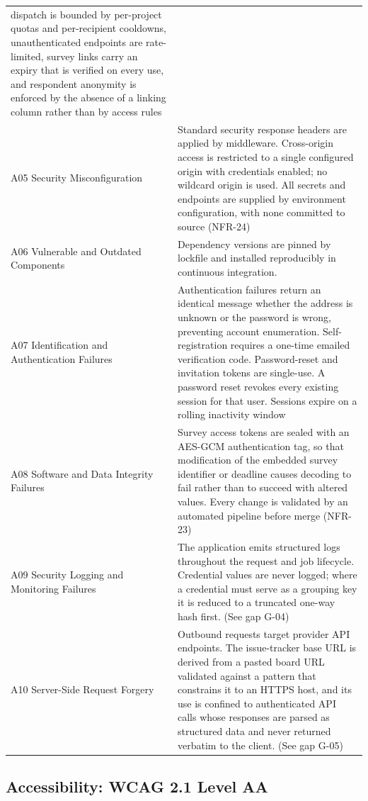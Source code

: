 \begin{longtable}{
  >{\raggedright\arraybackslash}p{}
  >{\raggedright\arraybackslash}p{}
}
dispatch is bounded by per-project quotas and per-recipient cooldowns,
unauthenticated endpoints are rate-limited, survey links carry an expiry that is
verified on every use, and respondent anonymity is enforced by the absence of a
linking column rather than by access rules \\
\addlinespace
A05 Security Misconfiguration & Standard security response headers are applied by
middleware. Cross-origin access is restricted to a single configured origin with
credentials enabled; no wildcard origin is used. All secrets and endpoints are
supplied by environment configuration, with none committed to source (NFR-24) \\
\addlinespace
A06 Vulnerable and Outdated Components & Dependency versions are pinned by lockfile
and installed reproducibly in continuous integration. \\
\addlinespace
A07 Identification and Authentication Failures & Authentication failures return an
identical message whether the address is unknown or the password is wrong, preventing
account enumeration. Self-registration requires a one-time emailed verification
code. Password-reset and invitation tokens are single-use. A password reset revokes
every existing session for that user. Sessions expire on a rolling inactivity window
\\
\addlinespace
A08 Software and Data Integrity Failures & Survey access tokens are sealed with an
AES-GCM authentication tag, so that modification of the embedded survey identifier or
deadline causes decoding to fail rather than to succeed with altered values. Every
change is validated by an automated pipeline before merge (NFR-23) \\
\addlinespace
A09 Security Logging and Monitoring Failures & The application emits structured logs
throughout the request and job lifecycle. Credential values are never logged; where a
credential must serve as a grouping key it is reduced to a truncated one-way hash
first. (See gap G-04) \\
\addlinespace
A10 Server-Side Request Forgery & Outbound requests target provider API endpoints.
The issue-tracker base URL is derived from a pasted board URL validated against a
pattern that constrains it to an HTTPS host, and its use is confined to authenticated
API calls whose responses are parsed as structured data and never returned verbatim
to the client. (See gap G-05) \\
\end{longtable}

\subsection{Accessibility: WCAG 2.1 Level AA}
\label{subsec:wcag}

